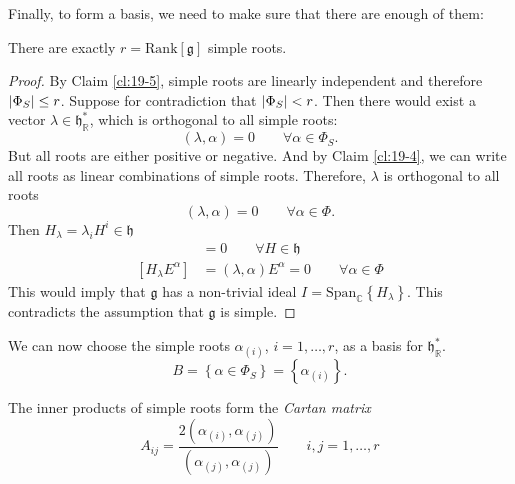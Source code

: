 Finally, to form a basis, we need to make sure that there are enough of them:
\begin{claim}
  There are exactly $r = \text{Rank}[\mathfrak{g}]$ simple roots.
\end{claim}
\begin{proof}
  By Claim \ref{cl:19-5}, simple roots are linearly independent and therefore $\abs{\Phi_S} \leq r$.
  Suppose for contradiction that $\abs{\Phi_S} < r$. Then there would exist a vector $\lambda \in \mathfrak{h}^*_\mathbb{R}$, which is orthogonal to all simple roots:
  \begin{equation}
    (\lambda, \alpha) = 0 \qquad \forall \alpha \in \Phi_S.
  \end{equation}
  But all roots are either positive or negative. And by Claim \ref{cl:19-4}, we can write all roots as linear combinations of simple roots. Therefore, $\lambda$ is orthogonal to all roots
  \begin{equation}
    (\lambda, \alpha) = 0 \qquad \forall \alpha \in \Phi.
  \end{equation}
  Then $H_{\lambda} = \lambda_{i} H^{i} \in \mathfrak{h}$
  \begin{align}
    [H_{\lambda}, H] &= 0 \qquad \forall H \in \mathfrak{h} \\
    [H_{\lambda} E^{\alpha}] &= (\lambda, \alpha) E^{\alpha}  = 0 \qquad \forall \alpha \in \Phi
  \end{align}
  This would imply that $\mathfrak{g}$ has a non-trivial ideal $I = \text{Span}_{\mathbb{C}}\left\{H_{\lambda}\right\}$. This contradicts the assumption that $\mathfrak{g}$ is simple.
\end{proof}

\begin{corollary}
  We can now choose the simple roots $\alpha_{(i)}$, $i = 1, \dots, r$, as a basis for $\mathfrak{h}^*_{\mathbb{R}}$.
  \begin{equation}
    B = \left\{ \alpha \in \Phi_S \right\} = \left\{ \alpha_{(i)} \right\}.
  \end{equation}
\end{corollary}

\begin{definition}[]
  The inner products of simple roots form the \emph{Cartan matrix}
  \begin{equation}
    A_{ij} = \frac{2(\alpha_{(i)}, \alpha_{(j)})}{(\alpha_{(j)}, \alpha_{(j)})} \qquad i,j = 1, \dots, r
  \end{equation}
\end{definition}

